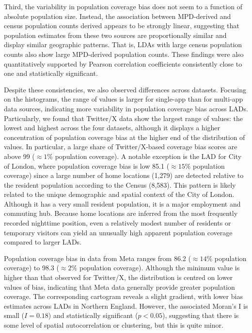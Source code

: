 \documentclass[]{rsos}%
\begin{document}
Third, the variability in population coverage bias does not seem to a function of
absolute population size. Instead, the association between MPD-derived and census population
counts derived appears to be strongly linear, suggesting that population estimates from these two sources are proportionally similar and display similar geographic patterns. That is, LDAs with large census population counts also show large MPD-derived population counts. These findings were also quantitatively supported by Pearson correlation
coefficients consistently close to one and statistically significant.

Despite these consistencies, we also observed differences across datasets. Focusing on the histograms, the range of values is larger for single-app than for multi-app data sources, indicating more variability in population coverage bias across LADs. Particularly, we found that Twitter/X data show the largest range of values: the lowest and highest across the four datasets, although it displays a higher concentration of population coverage bias at the higher end of the distribution of values. In particular, a large share of Twitter/X-based coverage bias scores are
above 99 (\(\approx 1 \%\) population coverage). A notable exception is the LAD
for City of London, where population coverage bias is low 85.1
(\(\approx 15 \%\) population coverage) since a large number of home locations (1,279) are detected relative to the resident population according to the Census (8,583). This pattern is likely related to the unique
demographic and spatial context of the City of London. Although it has a
very small resident population, it is a major employment and commuting hub. Because home locations are inferred from the most frequently
recorded nighttime position, even a relatively modest number
of residents or temporary visitors can yield an unusually high apparent
population coverage compared to larger LADs.

Population coverage bias in data from Meta
ranges from
86.2 (\(\approx 14 \%\) population coverage) to 98.3 (\(\approx 2 \%\)
population coverage). Although the minimum value is higher than that observed for Twitter/X, the distribution is centred on lower values of bias, indicating that Meta data generally provide greater population coverage. The corresponding cartogram reveals a slight gradient, with lower bias estimates across LADs in Northern England. However, the associated Moran's I is small (\(I = 0.18\)) and statistically significant (\(p < 0.05\)), suggesting that there is some level of spatial autocorrelation or clustering, but this is quite minor.
\end{document}
